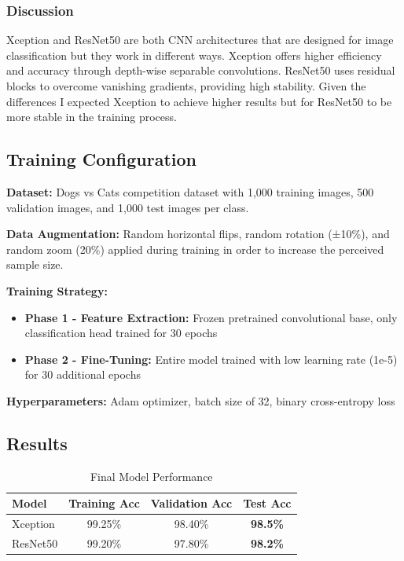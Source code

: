 \documentclass[11pt]{article}
\begin{document}
\subsubsection*{Discussion}
Xception and ResNet50 are both CNN architectures that are designed for image classification but they work in different ways. Xception offers higher efficiency and accuracy through depth-wise separable convolutions. ResNet50 uses residual blocks to overcome vanishing gradients, providing high stability. Given the differences I expected Xception to achieve higher results but for ResNet50 to be more stable in the training process. 

\subsection*{Training Configuration}

\textbf{Dataset:} Dogs vs Cats competition dataset with 1,000 training images, 500 validation images, and 1,000 test images per class.

\textbf{Data Augmentation:} Random horizontal flips, random rotation (±10\%), and random zoom (20\%) applied during training in order to increase the perceived sample size.

\textbf{Training Strategy:}
\begin{itemize}
    \item \textbf{Phase 1 - Feature Extraction:} Frozen pretrained convolutional base, only classification head trained for 30 epochs
    \item \textbf{Phase 2 - Fine-Tuning:} Entire model trained with low learning rate (1e-5) for 30 additional epochs
\end{itemize}

\textbf{Hyperparameters:} Adam optimizer, batch size of 32, binary cross-entropy loss

\subsection*{Results}

\begin{table}[h]
\centering
\caption{Final Model Performance}
\begin{tabular}{lccc}
\toprule
\textbf{Model} & \textbf{Training Acc} & \textbf{Validation Acc} & \textbf{Test Acc} \\
\midrule
Xception & 99.25\% & 98.40\% & \textbf{98.5\%} \\
ResNet50 & 99.20\% & 97.80\% & \textbf{98.2\%} \\
\bottomrule
\end{tabular}
\end{table}
\end{document}
